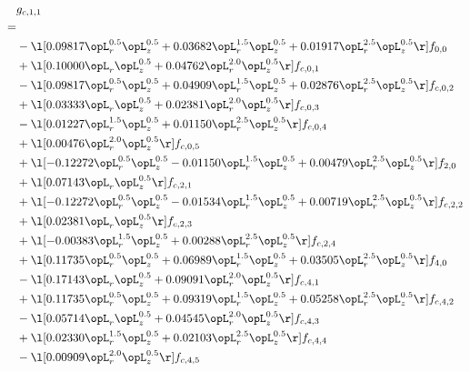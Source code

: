 \begin{alignat}{2} 
\label{eq:g_11_0} 
& g_{c,1,1} \nonumber \\ 
 = \\ 
& - \l[  0.09817 \opL_r^{0.5} \opL_z^{0.5} +  0.03682 \opL_r^{1.5} \opL_z^{0.5} +  0.01917 \opL_r^{2.5} \opL_z^{0.5}  \r] f_{0,0} \nonumber \\ 
& + \l[  0.10000 \opL_r \opL_z^{0.5} +  0.04762 \opL_r^{2.0} \opL_z^{0.5}  \r] f_{c,0,1} \nonumber \\ 
& - \l[  0.09817 \opL_r^{0.5} \opL_z^{0.5} +  0.04909 \opL_r^{1.5} \opL_z^{0.5} +  0.02876 \opL_r^{2.5} \opL_z^{0.5}  \r] f_{c,0,2} \nonumber \\ 
& + \l[  0.03333 \opL_r \opL_z^{0.5} +  0.02381 \opL_r^{2.0} \opL_z^{0.5}  \r] f_{c,0,3} \nonumber \\ 
& - \l[  0.01227 \opL_r^{1.5} \opL_z^{0.5} +  0.01150 \opL_r^{2.5} \opL_z^{0.5}  \r] f_{c,0,4} \nonumber \\ 
& + \l[  0.00476 \opL_r^{2.0} \opL_z^{0.5}  \r] f_{c,0,5} \nonumber \\ 
& + \l[  -0.12272 \opL_r^{0.5} \opL_z^{0.5}   -0.01150 \opL_r^{1.5} \opL_z^{0.5} +  0.00479 \opL_r^{2.5} \opL_z^{0.5}  \r] f_{2,0} \nonumber \\ 
& + \l[  0.07143 \opL_r \opL_z^{0.5}  \r] f_{c,2,1} \nonumber \\ 
& + \l[  -0.12272 \opL_r^{0.5} \opL_z^{0.5}   -0.01534 \opL_r^{1.5} \opL_z^{0.5} +  0.00719 \opL_r^{2.5} \opL_z^{0.5}  \r] f_{c,2,2} \nonumber \\ 
& + \l[  0.02381 \opL_r \opL_z^{0.5}  \r] f_{c,2,3} \nonumber \\ 
& + \l[  -0.00383 \opL_r^{1.5} \opL_z^{0.5} +  0.00288 \opL_r^{2.5} \opL_z^{0.5}  \r] f_{c,2,4} \nonumber \\ 
& + \l[  0.11735 \opL_r^{0.5} \opL_z^{0.5} +  0.06989 \opL_r^{1.5} \opL_z^{0.5} +  0.03505 \opL_r^{2.5} \opL_z^{0.5}  \r] f_{4,0} \nonumber \\ 
& - \l[  0.17143 \opL_r \opL_z^{0.5} +  0.09091 \opL_r^{2.0} \opL_z^{0.5}  \r] f_{c,4,1} \nonumber \\ 
& + \l[  0.11735 \opL_r^{0.5} \opL_z^{0.5} +  0.09319 \opL_r^{1.5} \opL_z^{0.5} +  0.05258 \opL_r^{2.5} \opL_z^{0.5}  \r] f_{c,4,2} \nonumber \\ 
& - \l[  0.05714 \opL_r \opL_z^{0.5} +  0.04545 \opL_r^{2.0} \opL_z^{0.5}  \r] f_{c,4,3} \nonumber \\ 
& + \l[  0.02330 \opL_r^{1.5} \opL_z^{0.5} +  0.02103 \opL_r^{2.5} \opL_z^{0.5}  \r] f_{c,4,4} \nonumber \\ 
& - \l[  0.00909 \opL_r^{2.0} \opL_z^{0.5}  \r] f_{c,4,5} \nonumber \\ 
\end{alignat} 


